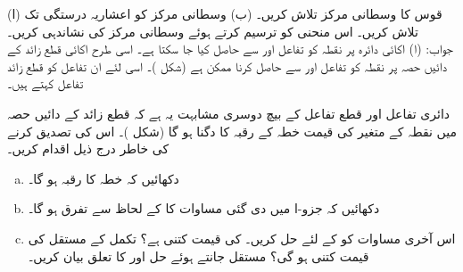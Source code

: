 %
(ا) قوس  کا وسطانی مرکز تلاش کریں۔ (ب) وسطانی مرکز کو اعشاریہ درستگی تک تلاش کریں۔ اس منحنی کو ترسیم کرتے ہوئے وسطانی مرکز کی نشاندہی کریں۔\\
جواب:\quad
(ا)  
اکائی دائرہ پر نقطہ  کو تفاعل  اور سے حاصل کیا جا سکتا ہے۔ اسی طرح اکائی قطع زائد کے دائیں حصہ پر نقطہ  کو تفاعل  اور  سے حاصل کرنا ممکن ہے (شکل )۔ اسی لئے ان تفاعل کو قطع زائد تفاعل کہتے ہیں۔ 

دائری تفاعل اور قطع تفاعل کے بیچ دوسری مشابہت یہ ہے کہ قطع زائد  کے دائیں حصہ میں نقطہ  کے متغیر    کی قیمت خطہ  کے رقبہ کا دگنا ہو گا (شکل )۔ اس کی تصدیق کرنے کی خاطر درج ذیل اقدام کریں۔
\begin{enumerate}[a.]
\item
دکھائیں کہ خطہ  کا رقبہ  ہو گا۔
\item
دکھائیں کہ جزو-ا میں دی گئی مساوات کا  کے لحاظ سے تفرق  ہو گا۔
\item
اس آخری مساوات کو  کے لئے حل کریں۔  کی قیمت کتنی ہے؟ تکمل کے مستقل  کی قیمت کتنی ہو گی؟ مستقل  جانتے ہوئے حل  اور  کا تعلق بیان کریں۔
\end{enumerate}
